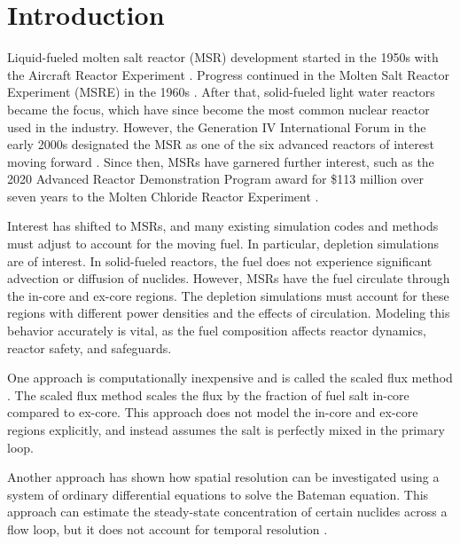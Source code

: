 \documentclass{style/nseJournal}
\begin{document}
\section{Introduction}\label{sec:1}

Liquid-fueled molten salt reactor (MSR) development started in the 1950s with the Aircraft Reactor Experiment \cite{bettis_aircraft_1957}.
Progress continued in the Molten Salt Reactor Experiment (MSRE) in the 1960s \cite{haubenreich_experience_1970}.
After that, solid-fueled light water reactors became the focus, which have since become the most common nuclear reactor used in the industry.
However, the Generation IV International Forum in the early 2000s designated the MSR as one of the six advanced reactors of interest moving forward \cite{kelly_generation_2014}.
Since then, MSRs have garnered further interest, such as the 2020 Advanced Reactor Demonstration Program award for \$113 million over seven years to the Molten Chloride Reactor Experiment \cite{doeardpmcre}.

Interest has shifted to MSRs, and many existing simulation codes and methods must adjust to account for the moving fuel.
In particular, depletion simulations are of interest.
In solid-fueled reactors, the fuel does not experience significant advection or diffusion of nuclides.
However, MSRs have the fuel circulate through the in-core and ex-core regions.
The depletion simulations must account for these regions with different power densities and the effects of circulation.
Modeling this behavior accurately is vital, as the fuel composition affects reactor dynamics, reactor safety, and safeguards.

One approach is computationally inexpensive and is called the scaled flux method \cite{betzler2021liquid}.
The scaled flux method scales the flux by the fraction of fuel salt in-core compared to ex-core.
This approach does not model the in-core and ex-core regions explicitly, and instead assumes the salt is perfectly mixed in the primary loop.

Another approach has shown how spatial resolution can be investigated using a system of ordinary differential equations to solve the Bateman equation.
This approach can estimate the steady-state concentration of certain nuclides across a flow loop, but it does not account for temporal resolution \cite{shahbazi_steady-state_2022}.
\end{document}
